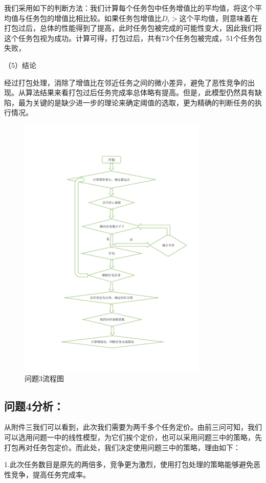 \documentclass{ctexart}
\begin{document}
我们采用如下的判断方法：我们计算每个任务包中任务增值比的平均值，将这个平均值与任务包的增值比相比较。如果任务包增值比$D_{i}>$这个平均值，则意味着在打包过后，总体的性能得到了提高，此时任务包被完成的可能性变大，因此我们将这个任务包视为成功。计算可得，打包过后，共有73个任务包被完成，51个任务包失败，

（5）结论

经过打包处理，消除了增值比在邻近任务之间的微小差异，避免了恶性竞争的出现。从算法结果来看打包过后任务完成率总体略有提高。但是，此模型仍然具有缺陷，最为关键的是缺少进一步的理论来确定阈值的选取，更为精确的判断任务的执行情况。

\newpage
\begin{figure}
\includegraphics[width=9cm]{流程图3.pdf}\centering
\caption*{问题3流程图}
\end{figure}



\newpage
\subsection{问题4分析：}


从附件三我们可以看到，此次我们需要为两千多个任务定价。由前三问可知，我们可以选用问题一中的线性模型，为它们挨个定价，也可以采用问题三中的策略，先打包再对任务包定价。而此处，我们决定使用问题三中的策略，理由如下：

1.此次任务数目是原先的两倍多，竞争更为激烈，使用打包处理的策略能够避免恶性竞争，提高任务完成率。
\end{document}
